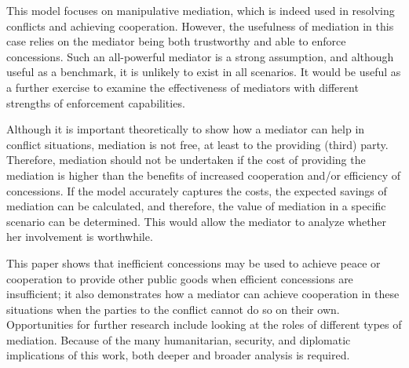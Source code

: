 \documentclass[bibtex,autowc]{apsr_submission}
\begin{document}
This model focuses on manipulative mediation, which is indeed used in resolving conflicts and achieving cooperation. However, the usefulness of mediation in this case relies on the mediator being both trustworthy and able to enforce concessions. Such an all-powerful mediator is a strong assumption, and although useful as a benchmark, it is unlikely to exist in all scenarios. It would be useful as a further exercise to examine the effectiveness of mediators with different strengths of enforcement capabilities. 

Although it is important theoretically to show how a mediator can help in conflict situations, mediation is not free, at least to the providing (third) party. Therefore, mediation should not be undertaken if the cost of providing the mediation is higher than the benefits of increased cooperation and/or efficiency of concessions. If the model accurately captures the costs, the expected savings of mediation can be calculated, and therefore, the value of mediation in a specific scenario can be determined. This would allow the mediator to analyze whether her involvement is worthwhile. 

This paper shows that inefficient concessions may be used to achieve peace or cooperation to provide other public goods when efficient concessions are insufficient; it also demonstrates how a mediator can achieve cooperation in these situations when the parties to the conflict cannot do so on their own. Opportunities for further research include looking at the roles of different types of mediation. Because of the many humanitarian, security, and diplomatic implications of this work, both deeper and broader analysis is required.


\newpage



\end{document}
